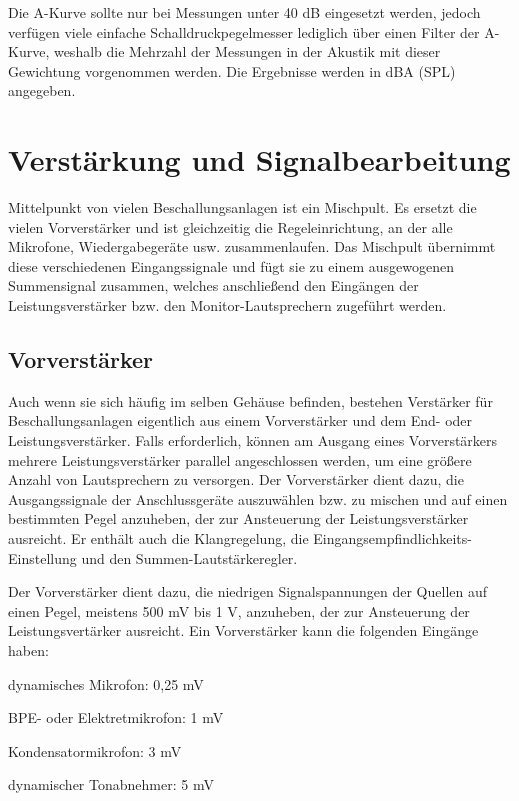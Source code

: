 Die A-Kurve sollte nur bei Messungen unter 40 dB eingesetzt werden, jedoch verfügen viele einfache Schalldruckpegelmesser lediglich über einen Filter der A-Kurve, weshalb die Mehrzahl der Messungen in der Akustik mit dieser Gewichtung vorgenommen werden. Die Ergebnisse werden in dBA (SPL) angegeben.

\section{Verstärkung und Signalbearbeitung} 
\label{sub:Verstaerkung}
Mittelpunkt von vielen Beschallungsanlagen ist ein Mischpult. Es ersetzt die vielen Vorverstärker und ist gleichzeitig die Regeleinrichtung, an der alle Mikrofone, Wiedergabegeräte usw. zusammenlaufen. Das Mischpult übernimmt diese verschiedenen Eingangssignale und fügt sie zu einem ausgewogenen Summensignal zusammen, welches anschließend den Eingängen der Leistungsverstärker bzw. den Monitor-Lautsprechern zugeführt werden.

\subsection{Vorverstärker}
\label{sub:Vorverstaerker}
Auch wenn sie sich häufig im selben Gehäuse befinden, bestehen Verstärker für Beschallungsanlagen eigentlich aus einem Vorverstärker und dem End- oder Leistungsverstärker. Falls erforderlich, können am Ausgang eines Vorverstärkers mehrere Leistungsverstärker parallel angeschlossen werden, um eine größere Anzahl von Lautsprechern zu versorgen.
Der Vorverstärker dient dazu, die Ausgangssignale der Anschlussgeräte auszuwählen bzw. zu mischen und auf einen bestimmten Pegel anzuheben, der zur Ansteuerung der Leistungsverstärker ausreicht. Er enthält auch die Klangregelung, die Eingangsempfindlichkeits-Einstellung und den Summen-Lautstärkeregler.

Der Vorverstärker dient dazu, die niedrigen Signalspannungen der Quellen auf einen Pegel, meistens 500 mV bis 1 V, anzuheben, der zur Ansteuerung der Leistungsvertärker ausreicht. Ein Vorverstärker kann die folgenden Eingänge haben:
\begin{compactenum} 
\item dynamisches Mikrofon: 0,25 mV
\item BPE- oder Elektretmikrofon: 1 mV
\item Kondensatormikrofon: 3 mV
\item dynamischer Tonabnehmer: 5 mV
\end{compactenum}

